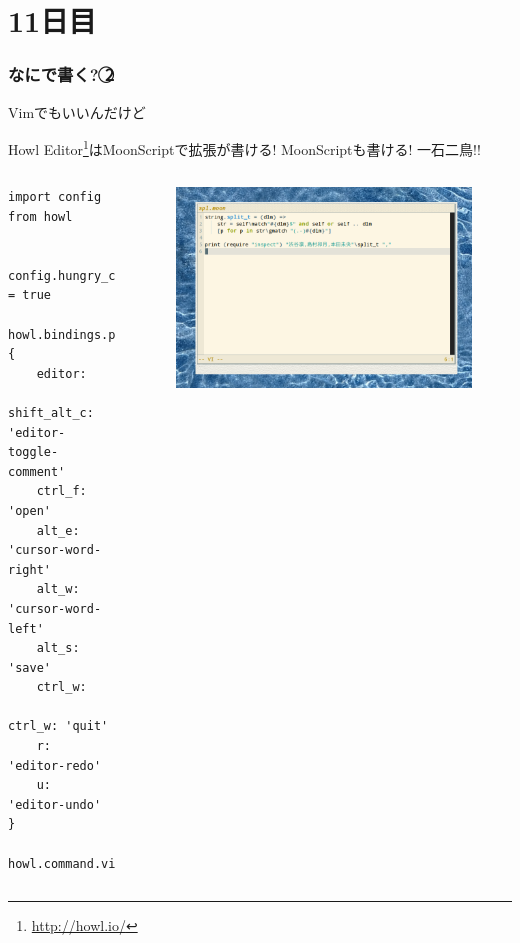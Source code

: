 \section{11日目}
\begin{frame}[fragile]
	\frametitle{なにで書く? \textcircled{2}}
	\alert{Vimでもいいんだけど}

	Howl Editor\footnote[frame]{\url{http://howl.io/}}はMoonScriptで拡張が書ける! MoonScriptも書ける! 一石二鳥!!

	\begin{columns}	
		\column[t]{.5\hsize}
		\tiny
		\begin{lstlisting}[numbers=none,language=MoonScript]
import config from howl


config.hungry_completion = true

howl.bindings.push {
	editor:
		shift_alt_c: 'editor-toggle-comment'
	ctrl_f: 'open'
	alt_e: 'cursor-word-right'
	alt_w: 'cursor-word-left'
	alt_s: 'save'
	ctrl_w:
		ctrl_w: 'quit'
	r:      'editor-redo'
	u:      'editor-undo'
}

howl.command.vi_on!
	\end{lstlisting}
	\column[t]{.5\hsize}
	\begin{figure}[h]
		\centering
		\includegraphics[width=\columnwidth]{img/howl.png}
		\end{figure}
	\end{columns}
\end{frame}
